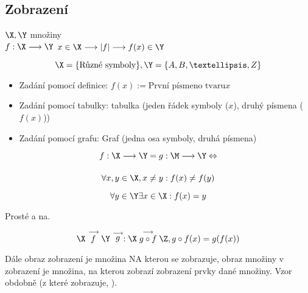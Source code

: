 \documentclass[12pt]{article}					%
\begin{document}
    \subsection{Zobrazení}
        $\X, \Y$ množiny\\
        $f: \X \longrightarrow \Y$ $x \in \X \longrightarrow |f| \longrightarrow f(x) \in \Y$

        \begin{priklady}
            $$ \X = \{\text{Různé symboly}\}, \Y = \{A, B, …, Z\}$$
            \begin{itemize}
                \item Zadání pomocí definice: $f(x):= \text{První písmeno tvaru} x$
                \item Zadání pomocí tabulky: tabulka (jeden řádek symboly ($x$), druhý písmena ($f(x)$))
                \item Zadání pomocí grafu: Graf (jedna osa symboly, druhá písmena)
            \end{itemize}
        \end{priklady}

        \begin{definice}  
            $$ f: \X \longrightarrow \Y = g: \M \longrightarrow \Y \Leftrightarrow$$
            $$  $$ 
        \end{definice}

        \begin{definice}[Prosté (= injektivní)]
            $$ \forall x,y \in \X, x \neq y: f(x) \neq f(y) $$ 
        \end{definice}

        \begin{definice}[Na (= surjektivní)]
            $$ \forall y \in \Y \exists x \in \X: f(x) = y $$ 
        \end{definice}

        \begin{definice}[Vzájemně jednoznačné (= bijektivní)]
            Prosté a na.
        \end{definice}

        \begin{definice}[Skládání]
                $$ \X \stackrel{\longrightarrow}{f} \Y \stackrel{\longrightarrow}{g}: \X \stackrel{\longrightarrow}{g\circ f} \Z, g\circ f(x) = g(f(x)) $$ 
        \end{definice}

        Dále obraz zobrazení je množina NA kterou se zobrazuje, obraz množiny v zobrazení je množina, na kterou zobrazí zobrazení prvky dané množiny. Vzor obdobně (z které zobrazuje, ).
\end{document}
